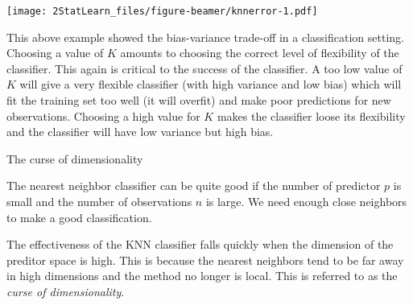 \documentclass[ignorenonframetext,]{beamer}
\begin{document}
\begin{frame}

\texttt{[image: 2StatLearn\_files/figure-beamer/knnerror-1.pdf]}

\end{frame}

\begin{frame}

This above example showed the bias-variance trade-off in a
classification setting. Choosing a value of \(K\) amounts to choosing
the correct level of flexibility of the classifier. This again is
critical to the success of the classifier. A too low value of \(K\) will
give a very flexible classifier (with high variance and low bias) which
will fit the training set too well (it will overfit) and make poor
predictions for new observations. Choosing a high value for \(K\) makes
the classifier loose its flexibility and the classifier will have low
variance but high bias.

\end{frame}

\begin{frame}

\begin{block}{The curse of dimensionality}

The nearest neighbor classifier can be quite good if the number of
predictor \(p\) is small and the number of observations \(n\) is large.
We need enough close neighbors to make a good classification.

The effectiveness of the KNN classifier falls quickly when the dimension
of the preditor space is high. This is because the nearest neighbors
tend to be far away in high dimensions and the method no longer is
local. This is referred to as the \emph{curse of dimensionality}.

\end{block}

\end{frame}
\end{document}
